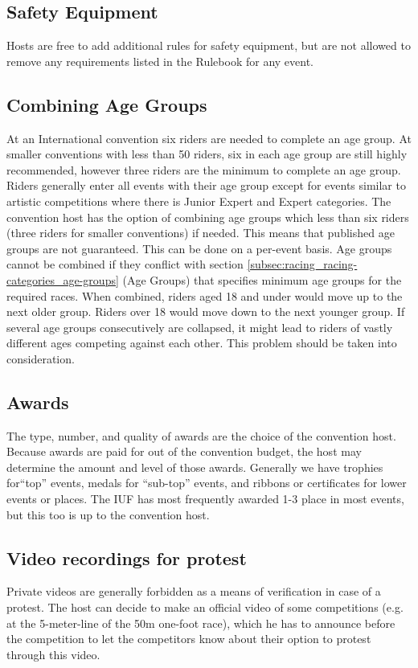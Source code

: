 \subsection{Safety Equipment}
Hosts are free to add additional rules for safety equipment, but are not allowed to remove any requirements listed in the Rulebook for any event.

\subsection{Combining Age Groups \label{subsec:general_host's-option-unicon_combining-age-groups}}
At an International convention six riders are needed to complete an age group. 
At smaller conventions with less than 50 riders, six in each age group are still highly recommended, however three riders are the minimum to complete an age group. 
Riders generally enter all events with their age group except for events similar to artistic competitions where there is Junior Expert and Expert categories. 
The convention host has the option of combining age groups which less than six riders (three riders for smaller conventions) if needed. 
This means that published age groups are not guaranteed.
This can be done on a per-event basis. 
Age groups cannot be combined if they conflict with section \ref{subsec:racing_racing-categories_age-groups} (Age Groups) that specifies minimum age groups for the required races. 
When combined, riders aged 18 and under would move up to the next older group. 
Riders over 18 would move down to the next younger group. 
If several age groups consecutively are collapsed, it might lead to riders of vastly different ages competing against each other. 
This problem should be taken into consideration.

\subsection{Awards}
The type, number, and quality of awards are the choice of the convention host. 
Because awards are paid for out of the convention budget, the host may determine the amount and level of those awards. 
Generally we have trophies for``top'' events, medals for ``sub-top'' events, and ribbons or certificates for lower events or places. 
The IUF has most frequently awarded 1-3 place in most events, but this too is up to the convention host.

\subsection{Video recordings for protest}
Private videos are generally forbidden as a means of verification in case of a protest. 
The host can decide to make an official video of some competitions (e.g. at the 5-meter-line of the 50m one-foot race), which he has to announce before the competition to let the competitors know about their option to protest through this video.

